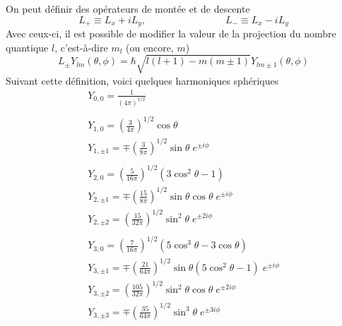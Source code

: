 On peut définir des opérateurs de montée et de descente
\begin{equation}
L_+ \equiv L_x+iL_y,\qquad\qquad\qquad\qquad L_- \equiv L_x-iL_y
\end{equation}
Avec ceux-ci, il est possible de modifier la valeur de la projection du nombre quantique $l$, c'est-à-dire
$m_l$ (ou encore, $m$)
\begin{equation}
L_\pm Y_{lm}(\theta,\phi) = \hbar\sqrt{l(l+1)-m(m\pm 1)}Y_{lm\pm1}(\theta,\phi)
\end{equation}
\newpage
Suivant cette définition, voici quelques harmoniques sphériques 
\begin{equation}
\begin{array}{l}
 Y_{0,0} = \frac{1}{(4 \pi)^{1/2}}  \\
\ \\
 Y_{1,0} = \left( \frac{3}{4 \pi} \right)^{1/2} \cos \theta \\
 Y_{1,\pm 1}  = \mp \left( \frac{3}{8 \pi} \right)^{1/2} \sin \theta \; e^{\pm i \phi} \\
\ \\
 Y_{2,0} = \left( \frac{5}{16 \pi} \right)^{1/2} (3 \cos^2 \theta - 1)   \\
 Y_{2,\pm 1} = \mp \left( \frac{15}{8 \pi} \right)^{1/2} \sin \theta \cos \theta \; e^{\pm i \phi} \\
 Y_{2,\pm 2} = \left( \frac{15}{32 \pi} \right)^{1/2} \sin^2 \theta \; e^{\pm 2i \phi} \\
\ \\
 Y_{3,0} = \left( \frac{7}{16 \pi} \right)^{1/2}   (5 \cos^3 \theta - 3 \cos \theta)  \\
 Y_{3,\pm 1} = \mp \left( \frac{21}{64 \pi} \right)^{1/2}    \sin \theta (5 \cos^2 \theta - 1)  \; e^{\pm i \phi} \\
 Y_{3,\pm 2} =  \left( \frac{105}{32\pi} \right)^{1/2}    \sin^2 \theta \cos \theta \; e^{\pm 2 i \phi} \\
 Y_{3,\pm 3} = \mp \left( \frac{35}{64 \pi} \right)^{1/2}    \sin^3 \theta  \; e^{\pm 3 i \phi}
\end{array}
\end{equation}



